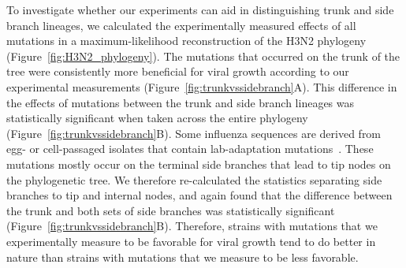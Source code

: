 \documentclass[9pt,twocolumn,twoside]{pnas-new}
\begin{document}
To investigate whether our experiments can aid in distinguishing trunk and side branch lineages, we calculated the experimentally measured effects of all mutations in a maximum-likelihood reconstruction of the H3N2 phylogeny (Figure~\ref{fig:H3N2_phylogeny}).
The mutations that occurred on the trunk of the tree were consistently more beneficial for viral growth according to our experimental measurements (Figure~\ref{fig:trunkvssidebranch}A).
This difference in the effects of mutations between the trunk and side branch lineages was statistically significant when taken across the entire phylogeny (Figure~\ref{fig:trunkvssidebranch}B).
Some influenza sequences are derived from egg- or cell-passaged isolates that contain lab-adaptation mutations~\citep{mcwhite2016sequence}.
These mutations mostly occur on the terminal side branches that lead to tip nodes on the phylogenetic tree.
We therefore re-calculated the statistics separating side branches to tip and internal nodes, and again found that the difference between the trunk and both sets of side branches was statistically significant (Figure~\ref{fig:trunkvssidebranch}B).
Therefore, strains with mutations that we experimentally measure to be favorable for viral growth tend to do better in nature than strains with mutations that we measure to be less favorable. 
\end{document}

